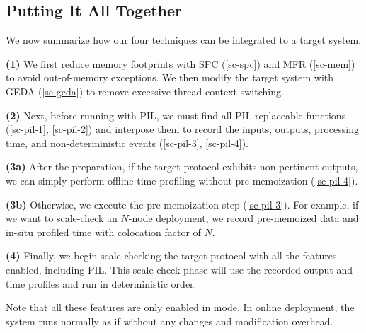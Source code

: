 \subsection{Putting It All Together}
\label{sc-summ}

 We now summarize how our four \sck techniques
can be integrated to a target system.  


{\bf (1)} We first reduce memory footprints with SPC (\sec\ref{sc-spc})
and MFR (\sec\ref{sc-mem}) to avoid out-of-memory exceptions.  
We then modify the target system with GEDA (\sec\ref{sc-geda}) to
remove excessive thread context switching.  

{\bf (2)} Next, before running \sck with PIL, we must find all
PIL-replaceable functions (\sec\ref{sc-pil-1}, \sec\ref{sc-pil-2}) and
interpose them to record the inputs, outputs, processing time, and
non-deterministic events (\sec\ref{sc-pil-3}, \sec\ref{sc-pil-4}).

%

{\bf (3a)} After the preparation, if the target protocol exhibits
non-pertinent outputs, we can simply perform offline time profiling without
pre-memoization (\sec\ref{sc-pil-4}).

{\bf (3b)} Otherwise, we execute the pre-memoization step
(\sec\ref{sc-pil-3}).  For example,
if we want to scale-check an $N$-node deployment, 
we record pre-memoized data and in-situ profiled time with
colocation factor of $N$.  

{\bf (4)} Finally, we begin scale-checking the target protocol with all
the features enabled, including PIL.  This scale-check phase will use the
recorded output and time profiles and run in deterministic order.

Note that all these features are only enabled in \sck mode.  In online
deployment, the system runs normally as if without any changes and
modification overhead.


